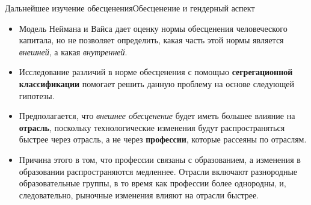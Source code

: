 \documentclass{beamer}
\begin{document}
\begin{frame}{Дальнейшее изучение обесценения}{Обесценение и гендерный аспект}
	\fontsize{8}{10}\selectfont
	\begin{itemize}
		\item Модель Неймана и Вайса дает оценку нормы обесценения человеческого капитала, но не позволяет определить, какая часть этой нормы является \textit{внешней}, а какая \textit{внутренней}.
		
		\item Исследование различий в норме обесценения с помощью \textbf{сегрегационной классификации} помогает решить данную проблему на основе следующей гипотезы.
		
		\item Предполагается, что \textit{внешнее обесценение} будет иметь большее влияние на \textbf{отрасль}, поскольку технологические изменения будут распространяться быстрее через отрасль, а не через \textbf{профессии}, которые рассеяны по отраслям.
		
		\item Причина этого в том, что профессии связаны с образованием, а изменения в образовании распространяются медленнее. Отрасли включают разнородные образовательные группы, в то время как профессии более однородны, и, следовательно, рыночные изменения влияют на отрасли быстрее.
	\end{itemize}
\end{frame}	
	
\end{document}
